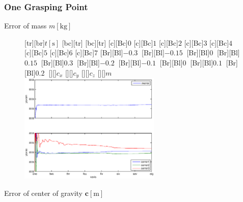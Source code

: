 \documentclass[student,noshadow]{ITRslides}
\renewcommand{\vec}[1]{\boldsymbol{#1}}
\renewcommand{\vec}[1]{\boldsymbol{#1}}
\begin{document}
\begin{frame}
	\frametitle{One Grasping Point}
	\begin{center}
		Error of mass $m \left[\mathrm{kg}\right]$
		\begin{figure}
			\centering	
			[tr][br]{$t\left[\mathrm{s}\right]$}
			[bc][tr]{}
			[bc][tr]{}
			[c][Bc]{$0$}
			[c][Bc]{$1$}
			[c][Bc]{$2$}
			[c][Bc]{$3$}
			[c][Bc]{$4$}
			[c][Bc]{$5$}
			[c][Bc]{$6$}
			[c][Bc]{$7$}
			[Br][Bl]{$-0.3\  $}
			[Br][Bl]{$-0.15\ $}
			[Br][Bl]{$0\  $}
			[Br][Bl]{$0.15\  $}
			[Br][Bl]{$0.3\  $}
			[Br][Bl]{$-0.2\  $}
			[Br][Bl]{$-0.1\ $}
			[Br][Bl]{$0\  $}
			[Br][Bl]{$0.1\  $}
			[Br][Bl]{$0.2\  $}
			[][]{\tiny $c_{x}$}
			[][]{\tiny $c_{y}$}
			[][]{\tiny $c_{z}$}
			[][]{\tiny $m$}
			\includegraphics[width=0.6\textwidth]{fig/one_grasping_point_fast_mass_and_cog.eps}
		\end{figure}
		\vspace{0.2cm}
		Error of center of gravity $\vec{c} \left[\mathrm{m}\right]$
	\end{center}
\end{frame}
\end{document}
